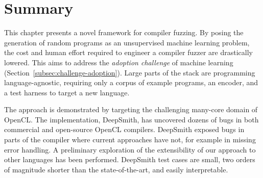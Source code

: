 \section{Summary}
\label{sec:deepsmith-conclusion}

This chapter presents a novel framework for compiler fuzzing. By posing the generation of random programs as an unsupervised machine learning problem, the cost and human effort required to engineer a compiler fuzzer are drastically lowered. This aims to address the \emph{adoption challenge} of machine learning (Section~\ref{subsec:challenge-adoption}). Large parts of the stack are programming language-agnostic, requiring only a corpus of example programs, an encoder, and a test harness to target a new language.

The approach is demonstrated by targeting the challenging many-core domain of OpenCL. The implementation, DeepSmith, has uncovered dozens of bugs in both commercial and open-source OpenCL compilers. DeepSmith exposed bugs in parts of the compiler where current approaches have not, for example in missing error handling. A preliminary exploration of the extensibility of our approach to other languages has been performed. DeepSmith test cases are small, two orders of magnitude shorter than the state-of-the-art, and easily interpretable.
